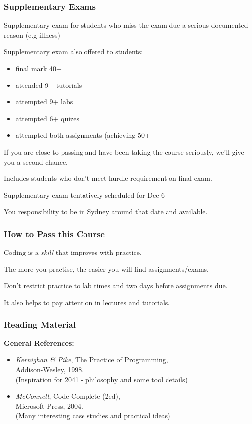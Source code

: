 \begin{frame}
\frametitle{Supplementary Exams}
Supplementary exam for students who miss the exam due a serious documented reason (e.g illness)

Supplementary exam also offered to students:
\begin{itemize}
\item final mark 40+
\item attended 9+ tutorials
\item attempted 9+ labs
\item attempted 6+ quizes
\item attempted both assignments (achieving 50+%
\end{itemize}

If you are close to passing and have been taking the course seriously,
we'll give you a second chance.

Includes students who don't meet hurdle requirement on final exam.

Supplementary exam tentatively scheduled for  Dec 6 

You responsibility to be in Sydney around that date and available.
\end{frame}


\begin{frame}
\frametitle{How to Pass this Course}
Coding is a {\em{skill}} that improves with practice.

The more you practise, the easier you will find assignments/exams.

Don't restrict practice to lab times and two days before assignments due.

It also helps to pay attention in lectures and tutorials.
\end{frame}

\begin{frame}
\frametitle{Reading Material}
{\bf{General References:}}
\begin{itemize}
\item  {\em{Kernighan \& Pike}},
	The Practice of Programming,
	\\{\small Addison-Wesley, 1998.
	\\(Inspiration for 2041 - philosophy and some tool details)}
\item  {\em{McConnell}},
	Code Complete (2ed),
	\\{\small Microsoft Press, 2004.
	\\(Many interesting case studies and practical ideas)}
\end{itemize}
\end{frame}

